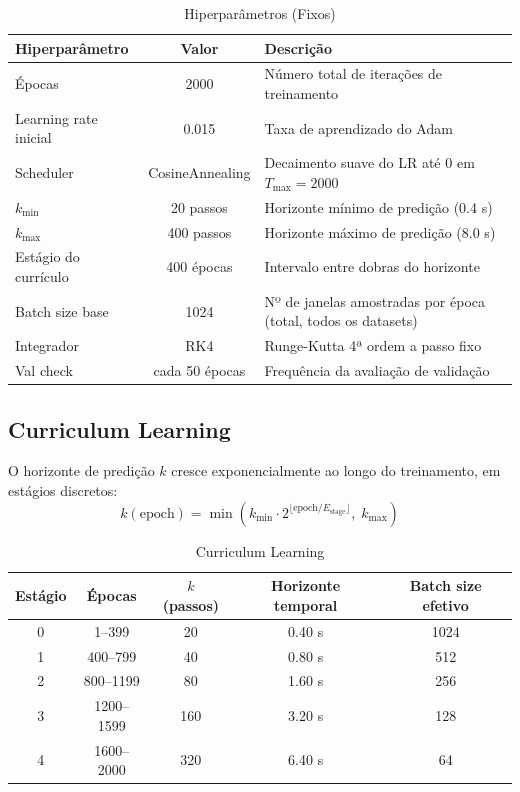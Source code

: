 \documentclass[11pt,a4paper]{article}
\begin{document}
\begin{table}[hbt!]
\centering
\caption{Hiperparâmetros (Fixos)}
\vspace{0.2cm}
\begin{tabular}{lcl}
\toprule
\textbf{Hiperparâmetro} & \textbf{Valor} & \textbf{Descrição} \\
\midrule
Épocas & 2000 & Número total de iterações de treinamento \\
Learning rate inicial & 0.015 & Taxa de aprendizado do Adam \\
Scheduler & CosineAnnealing & Decaimento suave do LR até 0 em $T_{\max} = 2000$ \\
$k_{\min}$ & 20 passos & Horizonte mínimo de predição (0.4 s) \\
$k_{\max}$ & 400 passos & Horizonte máximo de predição (8.0 s) \\
Estágio do currículo & 400 épocas & Intervalo entre dobras do horizonte \\
Batch size base & 1024 & Nº de janelas amostradas por época (total, todos os datasets) \\
Integrador & RK4 & Runge-Kutta 4ª ordem a passo fixo \\
Val check & cada 50 épocas & Frequência da avaliação de validação \\
\bottomrule
\end{tabular}
\end{table}

\subsection{Curriculum Learning}

O horizonte de predição $k$ cresce exponencialmente ao longo do treinamento, em estágios discretos:
%
\begin{equation}
k(\text{epoch}) = \min\left(k_{\min} \cdot 2^{\lfloor \text{epoch} / E_{\text{stage}} \rfloor},\; k_{\max}\right)
\end{equation}

\begin{table}[hbt!]
\centering
\caption{Curriculum Learning}
\vspace{0.2cm}
\begin{tabular}{ccccc}
\toprule
\textbf{Estágio} & \textbf{Épocas} & \textbf{$k$ (passos)} & \textbf{Horizonte temporal} & \textbf{Batch size efetivo} \\
\midrule
0 & 1--399 & 20 & 0.40 s & 1024 \\
1 & 400--799 & 40 & 0.80 s & 512 \\
2 & 800--1199 & 80 & 1.60 s & 256 \\
3 & 1200--1599 & 160 & 3.20 s & 128 \\
4 & 1600--2000 & 320 & 6.40 s & 64 \\
\bottomrule
\end{tabular}
\end{table}
\end{document}
